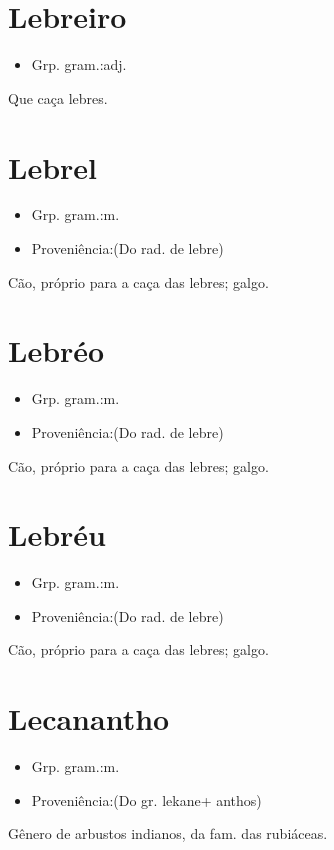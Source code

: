 \section{Lebreiro}
\begin{itemize}
\item {Grp. gram.:adj.}
\end{itemize}
Que caça lebres.
\section{Lebrel}
\begin{itemize}
\item {Grp. gram.:m.}
\end{itemize}
\begin{itemize}
\item {Proveniência:(Do rad. de \textunderscore lebre\textunderscore )}
\end{itemize}
Cão, próprio para a caça das lebres; galgo.
\section{Lebréo}
\begin{itemize}
\item {Grp. gram.:m.}
\end{itemize}
\begin{itemize}
\item {Proveniência:(Do rad. de \textunderscore lebre\textunderscore )}
\end{itemize}
Cão, próprio para a caça das lebres; galgo.
\section{Lebréu}
\begin{itemize}
\item {Grp. gram.:m.}
\end{itemize}
\begin{itemize}
\item {Proveniência:(Do rad. de \textunderscore lebre\textunderscore )}
\end{itemize}
Cão, próprio para a caça das lebres; galgo.
\section{Lecanantho}
\begin{itemize}
\item {Grp. gram.:m.}
\end{itemize}
\begin{itemize}
\item {Proveniência:(Do gr. \textunderscore lekane\textunderscore  + \textunderscore anthos\textunderscore )}
\end{itemize}
Gênero de arbustos indianos, da fam. das rubiáceas.
